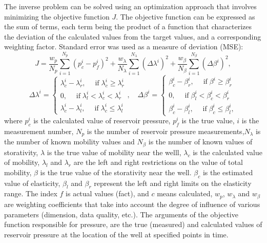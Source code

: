 \documentclass[
11pt,%
tightenlines,%
twoside,%
onecolumn,%
nofloats,%
nobibnotes,%
nofootinbib,%
superscriptaddress,%
noshowpacs,%
centertags]%
{revtex4}
\begin{document}
The inverse problem can be solved using an optimization approach that involves minimizing the objective function $J$.
The objective function can be expressed as the sum of terms, each term being the product of a function that characterizes the deviation of the calculated values from the target values, and a corresponding weighting factor. Standard error was used as a measure of deviation (MSE):
\begin{equation} \label{mse}
	J=\frac{w_p}{N_p}\sum_{i=1}^{N_p}{\left(p_c^i-p_f^i\right)^2}+
	\frac{w_{\lambda}}{N_\lambda}\sum_{i=1}^{N_\lambda}{\left(\Delta\lambda^i  \right)^2}+
	\frac{w_{\beta}}{N_\beta}\sum_{i=1}^{N_\beta}{\left(\Delta\beta^i  \right)^2},
\end{equation}
\begin{equation} \label{mse1}
	\Delta\lambda^i  = \left\{\begin{array}{crl}
		\lambda^i_c - \lambda^i_r, \quad \;\mbox{if}\; \lambda^i_c \ge \lambda^i_r\\
		0,\quad \;\mbox{if}\; \lambda^i_l < \lambda^i_c < \lambda^i_r\\
		\lambda^i_c - \lambda^i_l, \quad \;\mbox{if}\;\lambda^i_c \le \lambda^i_l
	\end{array}\right.,
	\quad
	\Delta\beta^i  = \left\{\begin{array}{crl}
		\beta^i_c - \beta^i_r, \quad \;\mbox{if}\; \beta^i \ge \beta^i_r\\
		0,\quad \;\mbox{if}\; \beta^i_l < \beta^i_c < \beta^i_r\\
		\beta^i_c - \beta^i_l, \quad \;\mbox{if}\;\beta^i_c \le \beta^i_l,
	\end{array}\right.
\end{equation}	
where $p_c^i$ is the calculated value of reservoir pressure, $p_f^i$
is the true value, $i$ is the measurement number, $N_p$ is the
number of reservoir pressure measurements,$N_\lambda$ is the
number of known mobility values and $N_\beta$ is the number of known values of storativity, $\lambda$ is the true value of mobility near the welll, $\lambda_c$ is the calculated value of mobility, $\lambda_l$ and $\lambda_r$ are the left and right restrictions on the value of total mobility, $\beta$ is the true value of the storativity near the well. $\beta_c$ is the estimated value of elasticity, $\beta_{l}$ and $\beta_{r}$ represent the left and right limits on the elasticity range. The index $f$ is actual values (fact), and $c$ means calculated, $w_p$, $w_\lambda$ and $w_\beta$ are weighting coefficients that take into account the degree of influence of various parameters (dimension, data quality, etc.). The arguments of the objective function responsible for pressure, are the true (measured) and calculated values of reservoir pressure at the location of the well at specified points in time.
\end{document}
